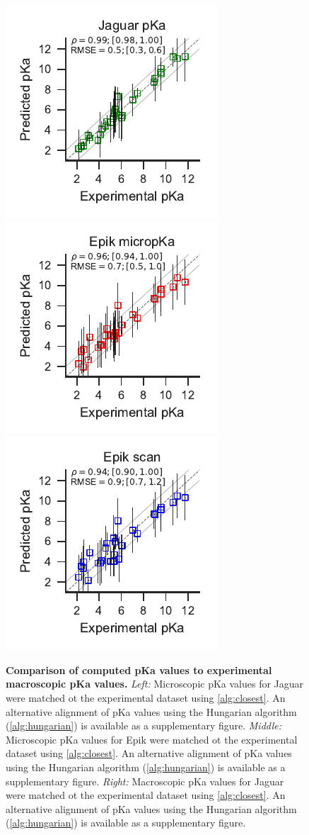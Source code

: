 \documentclass[9pt,lineno,final]{elife}
\begin{document}
\begin{figure}[H]
\centering
\includegraphics[]{closest_pka_jaguar.pdf}
\includegraphics[]{closest_pka_epik_micropka.pdf}
\includegraphics[]{closest_pka_epik_scan.pdf}
\caption{{\bf Comparison of computed pKa values to experimental macroscopic pKa values.} {\it Left:} Microscopic pKa values for Jaguar were matched ot the experimental dataset using \cref{alg:closest}. An alternative alignment of pKa values using the Hungarian algorithm (\cref{alg:hungarian}) is available as a supplementary figure.
{\it Middle:} Microscopic pKa values for Epik were matched ot the experimental dataset using \cref{alg:closest}. An alternative alignment of pKa values using the Hungarian algorithm (\cref{alg:hungarian}) is available as a supplementary figure.
{\it Right:} Macroscopic pKa values for Jaguar were matched ot the experimental dataset using \cref{alg:closest}. An alternative alignment of pKa values using the Hungarian algorithm (\cref{alg:hungarian}) is available as a supplementary figure. \label{correlation-closest}}



\end{figure}
\end{document}
